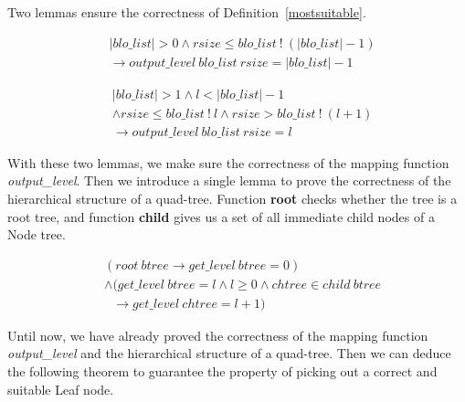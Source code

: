 Two lemmas ensure the correctness of Definition~\ref{mostsuitable}.

\begin{lemma} 
\end{lemma}
\vspace{-7pt}
{\footnotesize
\begin{align*}
&\vert blo\_list \vert > 0 \wedge rsize \leq blo\_list\ !\ (\vert blo\_list \vert - 1) \\
&\longrightarrow output\_level\ blo\_list\ rsize = \vert blo\_list \vert - 1
\end{align*}
}
\vspace{-12pt}	

\begin{lemma} 
\end{lemma}
\vspace{-7pt}
{\footnotesize
\begin{align*}
&\vert blo\_list \vert > 1 \wedge l < \vert blo\_list \vert - 1 \\
&\wedge rsize \leq blo\_list\ !\ l \wedge rsize > blo\_list\ !\ (l + 1) \\
&\longrightarrow output\_level\ blo\_list\ rsize = l
\end{align*}
}
\vspace{-12pt}

With these two lemmas, we make sure the correctness of the mapping function \emph{output\_level}. Then we introduce a single lemma to prove the correctness of the hierarchical structure of a quad-tree. Function \textbf{root} checks whether the tree is a root tree, and function \textbf{child} gives us a set of all immediate child nodes of a Node tree.

\begin{lemma} 
\end{lemma}
\vspace{-7pt}
{\footnotesize
\begin{align*}
&(root\ btree \longrightarrow get\_level\ btree = 0) \\
&\wedge (get\_level\ btree = l \wedge l \geq 0 \wedge chtree \in child\ btree \\
&\ \ \ \longrightarrow get\_level\ chtree = l + 1)
\end{align*}
}	
\vspace{-12pt}

Until now, we have already proved the correctness of the mapping function \emph{output\_level} and the hierarchical structure of a quad-tree. Then we can deduce the following theorem to guarantee the property of picking out a correct and suitable Leaf node.

